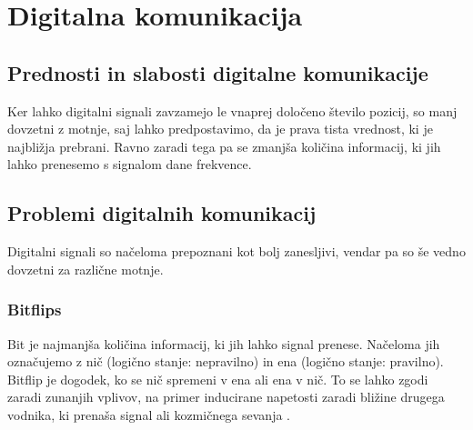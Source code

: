 \documentclass[12pt]{article}
\begin{document}
\newpage
\section{Digitalna komunikacija}
    \subsection{Prednosti in slabosti digitalne komunikacije}
        Ker lahko digitalni signali zavzamejo le vnaprej določeno število 
        pozicij, so manj dovzetni z motnje, saj lahko predpostavimo, da je prava
        tista vrednost, ki je najbližja prebrani. Ravno zaradi tega pa se 
        zmanjša količina informacij, ki jih lahko prenesemo s signalom dane 
        frekvence.
    \subsection{Problemi digitalnih komunikacij}
        Digitalni signali so načeloma prepoznani kot bolj zanesljivi, vendar pa
        so še vedno dovzetni za različne motnje.
        \subsubsection{Bitflips}
            Bit je najmanjša količina informacij, ki jih lahko signal prenese. 
            Načeloma jih označujemo z nič (logično stanje: nepravilno) in ena 
            (logično stanje: pravilno). Bitflip je dogodek, ko se nič spremeni v
            ena ali ena v nič. To se lahko zgodi zaradi zunanjih vplivov, na 
            primer inducirane napetosti zaradi bližine drugega vodnika, ki 
            prenaša signal ali kozmičnega sevanja \cite{veritasium_computers}.
\end{document}
